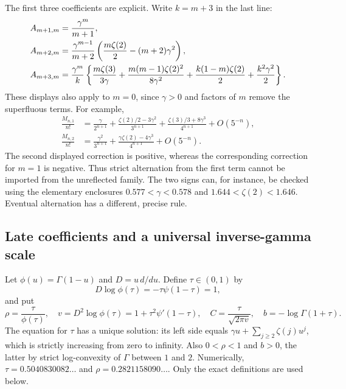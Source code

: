 The first three coefficients are explicit.  Write $k=m+3$ in the last line:
\begin{align}
 A_{m+1,m}&=\frac{\gamma^m}{m+1},\label{reflected:gam:eq:first-three}\\
 A_{m+2,m}&=\frac{\gamma^{m-1}}{m+2}
 \left(\frac{m\zeta(2)}2-(m+2)\gamma^2\right),\notag\\
 A_{m+3,m}&=\frac{\gamma^m}{k}
 \left\{\frac{m\zeta(3)}{3\gamma}
 +\frac{m(m-1)\zeta(2)^2}{8\gamma^2}
 +\frac{k(1-m)\zeta(2)}2+\frac{k^2\gamma^2}2\right\}.\notag
\end{align}
These displays also apply to $m=0$, since $\gamma>0$ and factors of
$m$ remove the superfluous terms.  For example,
\begin{align*}
 \frac{M_{n,1}}{n!}
 &=\frac{\gamma}{2^{n+1}}
 +\frac{\zeta(2)/2-3\gamma^2}{3^{n+1}}
 +\frac{\zeta(3)/3+8\gamma^3}{4^{n+1}}+O(5^{-n}),\\
 \frac{M_{n,2}}{n!}
 &=\frac{\gamma^2}{3^{n+1}}
 +\frac{\gamma\zeta(2)-4\gamma^3}{4^{n+1}}+O(5^{-n}).
\end{align*}
The second displayed correction is positive, whereas the corresponding
correction for $m=1$ is negative.  Thus strict alternation from the first
term cannot be imported from the unreflected family.  The two signs can,
for instance, be checked using the elementary enclosures
$0.577<\gamma<0.578$ and $1.644<\zeta(2)<1.646$.
Eventual alternation has a different, precise rule.

\subsection{Late coefficients and a universal inverse-gamma scale}

Let $\phi(u)=\Gamma(1-u)$ and $D=u\,d/du$.  Define $\tau\in(0,1)$ by
\begin{equation}\label{reflected:gam:eq:critical}
 D\log\phi(\tau)=-\tau\psi(1-\tau)=1,
\end{equation}
and put
\begin{equation}\label{reflected:gam:eq:constants}
 \rho=\frac{\tau}{\phi(\tau)},\quad
 v=D^2\log\phi(\tau)=1+\tau^2\psi'(1-\tau),\quad
 C=\frac{\tau}{\sqrt{2\pi v}},\quad
 b=-\log\Gamma(1+\tau).
\end{equation}
The equation for $\tau$ has a unique solution: its left side equals
$\gamma u+\sum_{j\ge2}\zeta(j)u^j$, which is strictly increasing from
zero to infinity.  Also $0<\rho<1$ and $b>0$, the latter by strict
log-convexity of $\Gamma$ between $1$ and $2$.  Numerically,
$\tau=0.5040830082\ldots$ and $\rho=0.2821158090\ldots$.
Only the exact definitions are used below.

